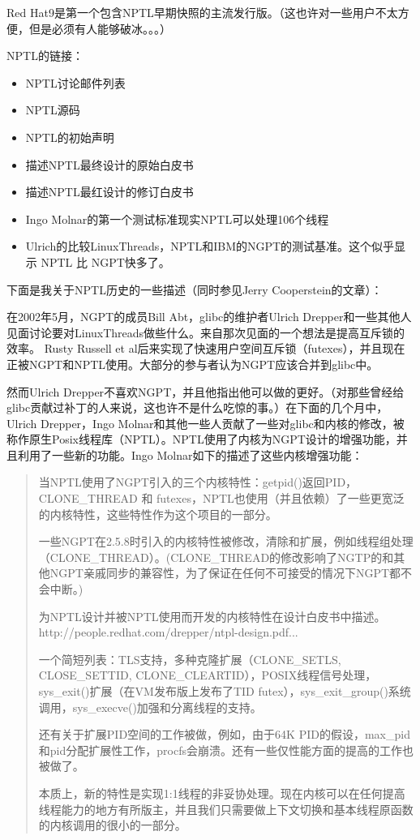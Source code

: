 \documentclass[12pt, twoside, a4paper, xetex]{report}
\begin{document}
	Red Hat9是第一个包含NPTL早期快照的主流发行版。（这也许对一些用户不太方便，但是必须有人能够破冰。。。）

	NPTL的链接：
	\begin{itemize}
		\item NPTL讨论邮件列表
		\item NPTL源码
		\item NPTL的初始声明
		\item 描述NPTL最终设计的原始白皮书
		\item 描述NPTL最红设计的修订白皮书
		\item Ingo Molnar的第一个测试标准现实NPTL可以处理10\^6个线程
		\item Ulrich的比较LinuxThreads，NPTL和IBM的NGPT的测试基准。这个似乎显示 NPTL 比 NGPT快多了。
	\end{itemize}

	下面是我关于NPTL历史的一些描述（同时参见Jerry Cooperstein的文章）：

	在2002年5月，NGPT的成员Bill Abt，glibc的维护者Ulrich Drepper和一些其他人见面讨论要对LinuxThreads做些什么。来自那次见面的一个想法是提高互斥锁的效率。 Rusty Russell et al后来实现了快速用户空间互斥锁（futexes），并且现在正被NGPT和NPTL使用。大部分的参与者认为NGPT应该合并到glibc中。

	然而Ulrich Drepper不喜欢NGPT，并且他指出他可以做的更好。（对那些曾经给\\glibc贡献过补丁的人来说，这也许不是什么吃惊的事。）在下面的几个月中，Ulrich Drepper，Ingo Molnar和其他一些人贡献了一些对glibc和内核的修改，被称作原生Posix线程库（NPTL）。NPTL使用了内核为NGPT设计的增强功能，并且利用了一些新的功能。Ingo Molnar如下的描述了这些内核增强功能：

	\begin{quotation}
		当NPTL使用了NGPT引入的三个内核特性：getpid()返回PID，\\ CLONE\_THREAD 和 futexes，NPTL也使用（并且依赖）了一些更宽泛的内核特性，这些特性作为这个项目的一部分。

		一些NGPT在2.5.8时引入的内核特性被修改，清除和扩展，例如线程组处理（CLONE\_THREAD）。(CLONE\_THREAD的修改影响了NGTP的和其他NGPT亲戚同步的兼容性，为了保证在任何不可接受的情况下NGPT都不会中断。)
		
		为NPTL设计并被NPTL使用而开发的内核特性在设计白皮书中描述。http://people.redhat.com/drepper/ntpl-design.pdf...

		一个简短列表：TLS支持，多种克隆扩展（CLONE\_SETLS, CLOSE\_SETTID, CLONE\_CLEARTID），POSIX线程信号处理， sys\_exit()扩展（在VM发布版上发布了TID futex），sys\_exit\_group()系统调用，sys\_execve()加强和分离线程的支持。

		还有关于扩展PID空间的工作被做，例如，由于64K PID的假设，max\_pid和pid分配扩展性工作，procfs会崩溃。还有一些仅性能方面的提高的工作也被做了。

		本质上，新的特性是实现1:1线程的非妥协处理。现在内核可以在任何提高线程能力的地方有所版主，并且我们只需要做上下文切换和基本线程原函数的内核调用的很小的一部分。
	\end{quotation}
\end{document}
